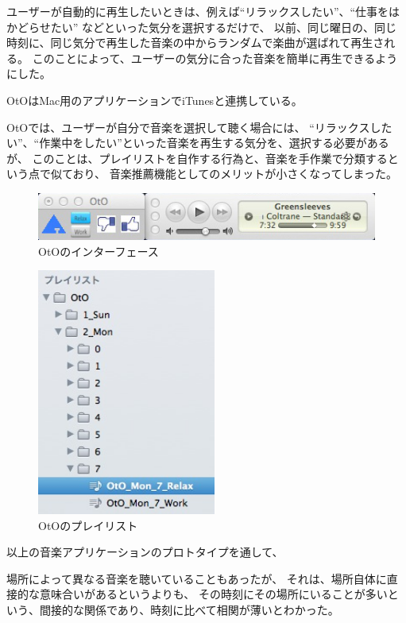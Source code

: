 \documentclass[a4paper, 11pt, onecolumn, report]{jsarticle}
\begin{document}
ユーザーが自動的に再生したいときは、例えば``リラックスしたい''、``仕事をはかどらせたい''
などといった気分を選択するだけで、
以前、同じ曜日の、同じ時刻に、同じ気分で再生した音楽の中からランダムで楽曲が選ばれて再生される。
このことによって、ユーザーの気分に合った音楽を簡単に再生できるようにした。

OtOはMac用のアプリケーションでiTunesと連携している。

OtOでは、ユーザーが自分で音楽を選択して聴く場合には、
``リラックスしたい''、``作業中をしたい''といった音楽を再生する気分を、選択する必要があるが、
このことは、プレイリストを自作する行為と、音楽を手作業で分類するという点で似ており、
音楽推薦機能としてのメリットが小さくなってしまった。

\begin{figure}[h]
\begin{center}
\includegraphics[width=14cm]{OtO_imageView.jpg}
\caption{OtOのインターフェース}
\label{OtO_interface}
\end{center}
\end{figure}

\begin{figure}[h]
\begin{center}
\includegraphics[width=5.866cm]{OtO_playList.jpg}
\caption{OtOのプレイリスト}
\label{OtO_playlist}
\end{center}
\end{figure}


以上の音楽アプリケーションのプロトタイプを通して、

場所によって異なる音楽を聴いていることもあったが、
それは、場所自体に直接的な意味合いがあるというよりも、
その時刻にその場所にいることが多いという、間接的な関係であり、時刻に比べて相関が薄いとわかった。
\end{document}
